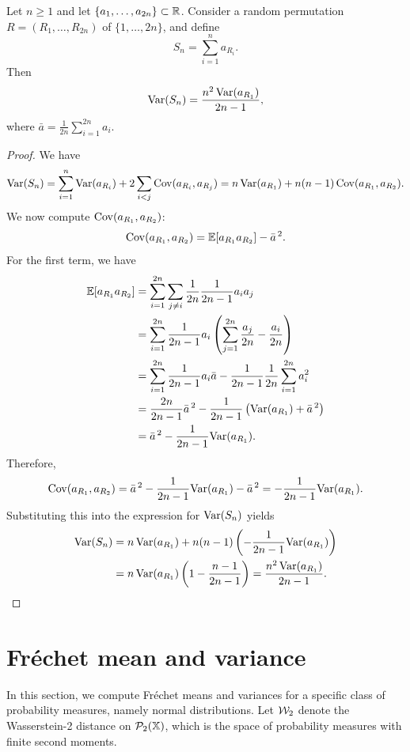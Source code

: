 \begin{lemma}\label{lemma::sum_under_permutation}
Let $n \geq 1$ and let $\{a_1, \dots, a_{2n}\} \subset \mathbb{R}$. Consider a random permutation
$R = (R_1, \dots, R_{2n})$ of $\{1, \dots, 2n\}$, and define
\[
S_n = \sum_{i = 1}^n a_{R_i}.
\]
Then
\[
\mathrm{Var}(S_n) = \frac{n^2\,\mathrm{Var}(a_{R_1})}{2n - 1},
\]
where $\bar{a} = \frac{1}{2n}\sum_{i = 1}^{2n} a_i$.
\end{lemma}
\begin{proof}
We have
\[
\mathrm{Var}(S_n)
= \sum_{i = 1}^n \mathrm{Var}(a_{R_i}) + 2 \sum_{i < j} \mathrm{Cov}(a_{R_i}, a_{R_j})
= n\,\mathrm{Var}(a_{R_1}) + n(n-1)\,\mathrm{Cov}(a_{R_1}, a_{R_2}).
\]
We now compute $\mathrm{Cov}(a_{R_1}, a_{R_2})$:
\[
\mathrm{Cov}(a_{R_1}, a_{R_2})
= \mathbb{E}[a_{R_1} a_{R_2}] - \bar{a}^{\,2}.
\]
For the first term, we have
\begin{align*}
\mathbb{E}[a_{R_1} a_{R_2}]
&= \sum_{i = 1}^{2n} \sum_{j \neq i}
\frac{1}{2n}\frac{1}{2n - 1} a_i a_j \\
&= \sum_{i = 1}^{2n} \frac{1}{2n - 1} a_i
\left( \sum_{j = 1}^{2n} \frac{a_j}{2n} - \frac{a_i}{2n} \right) \\
&= \sum_{i = 1}^{2n} \frac{1}{2n - 1} a_i \bar{a}
- \frac{1}{2n - 1}\frac{1}{2n} \sum_{i = 1}^{2n} a_i^2 \\
&= \frac{2n}{2n - 1} \bar{a}^{\,2}
- \frac{1}{2n - 1}\left(\mathrm{Var}(a_{R_1}) + \bar{a}^{\,2}\right) \\
&= \bar{a}^{\,2} - \frac{1}{2n - 1}\mathrm{Var}(a_{R_1}).
\end{align*}
Therefore,
\[
\mathrm{Cov}(a_{R_1}, a_{R_2})
= \bar{a}^{\,2} - \frac{1}{2n - 1}\mathrm{Var}(a_{R_1}) - \bar{a}^{\,2}
= -\frac{1}{2n - 1}\mathrm{Var}(a_{R_1}).
\]
Substituting this into the expression for $\mathrm{Var}(S_n)$ yields
\begin{align*}
\mathrm{Var}(S_n)
&= n\,\mathrm{Var}(a_{R_1})
+ n(n-1)\left(-\frac{1}{2n - 1}\mathrm{Var}(a_{R_1})\right) \\
&= n\,\mathrm{Var}(a_{R_1})
\left(1 - \frac{n-1}{2n - 1}\right)
= \frac{n^2\,\mathrm{Var}(a_{R_1})}{2n - 1}.
\end{align*}
\end{proof}






\section{Fr\'echet mean and variance}\label{section:frechet_mean_variance}

In this section, we compute Fr\'{e}chet means and variances for a specific class of probability measures, namely normal distributions. Let $\mathcal{W}_2$ denote the Wasserstein-2 distance on $\mathcal{P}_2(\mathbb{X})$, which is the space of probability measures with finite second moments. 

